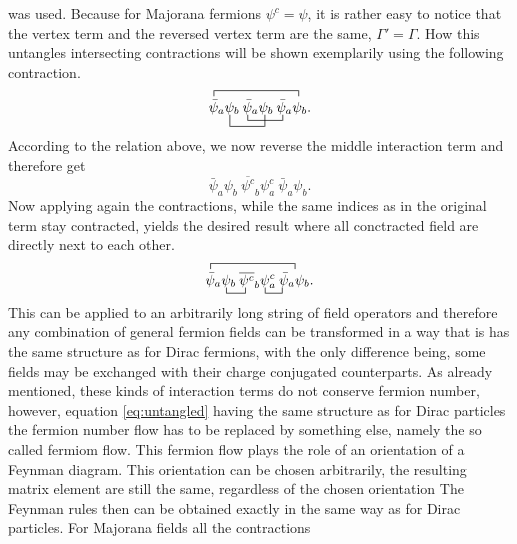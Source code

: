 was used.
Because for Majorana fermions $\psi^c=\psi$, it is rather easy to notice that the vertex term and the reversed vertex term are the same, $\Gamma'=\Gamma$. \newline\indent
How this untangles intersecting contractions will be shown exemplarily using the following contraction.
\begin{equation*}
	\contraction{}{\bar{\psi}}{{_a\psi_b\:\bar{\psi}_a\psi_b\:\bar{\psi}_a}}{\psi}
	\bcontraction[2ex]{\bar{\psi}_a}{\psi}{{}_b\:\bar{\psi}_a}{\psi}
	\bcontraction{\bar{\psi}_a\psi_b\:}{\bar{\psi}}{{}_a\psi_b\:}{\bar{\psi}}
	\bar{\psi}_a\psi_b\:\bar{\psi}_a\psi_b\:\bar{\psi}_a\psi_b.
\end{equation*}
According to the relation above, we now reverse the middle interaction term and therefore get
\begin{equation*}
	\bar{\psi}_a\psi_b\:\overline{\psi^c}_b\psi^c_a\:\bar{\psi}_a\psi_b.
\end{equation*}
Now applying again the contractions, while the same indices as in the original term stay contracted, yields the desired result where all conctracted field are directly next to each other. 
\begin{equation}
\contraction{}{\bar{\psi}}{{_a\psi_b\:\bar{\psi}_a\psi_b\:\bar{\psi}_a}}{\psi}
\bcontraction{\bar{\psi}_a}{\psi}{{}_b\:}{\psi}
\bcontraction{\bar{\psi}_a\psi_b\:\overline{\psi^c}_b}{\bar{\psi}}{{}_a}{\bar{\psi}}
\bar{\psi}_a\psi_b\:\overline{\psi^c}_b\psi^c_a\:\bar{\psi}_a\psi_b.
\label{eq:untangled}
\end{equation}
This can be applied to an arbitrarily long string of field operators and therefore any combination of general fermion fields can be transformed in a way that is has the same structure as for Dirac fermions, with the only difference being, some fields may be exchanged with their charge conjugated counterparts. As already mentioned, these kinds of interaction terms do not conserve fermion number, however, equation \eqref{eq:untangled} having the same structure as for Dirac particles the fermion number flow has to be replaced by something else, namely the so called fermiom flow. This fermion flow plays the role of an orientation of a Feynman diagram. This orientation can be chosen arbitrarily, the resulting matrix element are still the same, regardless of the chosen orientation\cite[p. 474]{Denner:1992vza}\newline\indent 
The Feynman rules then can be obtained exactly in the same way as for Dirac particles. For Majorana fields all the contractions 
